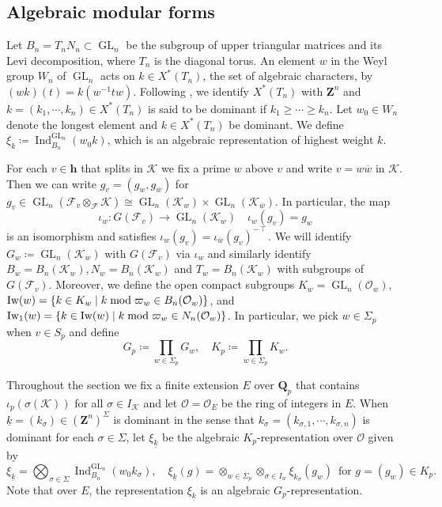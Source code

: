 \documentclass[leqno]{amsart}
\theoremstyle{definition}
\theoremstyle{remark}
\newcommand{\oo}{\mathcal{O}}
\newcommand{\Z}{{\mathbf{Z}}}
\newcommand{\Qp}{\mathbf{Q}_p}
\newcommand{\finite}{\mathbf{h}}
\DeclareMathOperator{\Ind}{Ind}
\DeclareMathOperator{\GL}{GL}
\newcommand{\F}{{\mathcal{F}}} %
\newcommand{\K}{{\mathcal{K}}} %
\newcommand{\bw}{\overline{w}}
\newcommand{\wt}[1]{\underline{ #1 }}
\newcommand{\Iw}{\textnormal{Iw}} %
\begin{document}
\subsection{Algebraic modular forms}

Let $B_n=T_nN_n\subset \GL_n$ be the subgroup of
upper triangular matrices and its Levi decomposition,
where $T_n$ is the diagonal torus.
An element $w$ in the Weyl group $W_n$ of $\GL_n$
acts on $k\in X^*(T_n)$, the set of algebraic characters,
by $(wk)(t)=k(w^{-1}tw)$.
Following \cite[Def 2.3]{ger},
we identify $X^*(T_n)$ with $\Z^n$
and $k=(k_1,\cdots,k_n)\in X^*(T_n)$
is said to be dominant if $k_1\geq \cdots\geq k_n$.
Let $w_0\in W_n$ denote the longest element
and $k\in X^*(T_n)$ be dominant.
We define $\xi_k\coloneqq \Ind_{B_n}^{\GL_n}(w_0k)$,
which is an algebraic representation 
of highest weight $k$.

For each $v\in\finite$ that splits in $\K$
we fix a prime $w$ above $v$
and write $v=w\bw$ in $\K$.
Then we can write $g_v=(g_w,g_{\bw})$
for $g_v\in \GL_n(\F_v\otimes_\F\K)
\cong \GL_n(\K_w)\times\GL_n(\K_{\bw})$.
In particular, the map
\begin{equation}
\iota_w\colon G(\F_v)\to \GL_n(\K_w)\quad
\iota_w(g_v)=g_w
\end{equation}
is an isomorphism and satisfies
$\iota_w(g_v)=\iota_{\bw}(g_v)^{-\intercal}$.
We will identify $G_w\coloneqq\GL_n(\K_w)$
with $G(\F_v)$ via $\iota_w$
and similarly identify 
$B_w=B_n(\K_w), N_w=B_n(\K_w)$ and
$T_w=B_n(\K_w)$
with subgroups of $G(\F_v)$.
Moreover, we define the open 
compact subgroups
$K_w=\GL_n(\oo_w)$,
$\Iw(w)=\{k\in K_w\mid k\bmod \varpi_w\in B_n(\oo_w)\}$, and
$\Iw_1(w)=\{k\in \Iw(w)\mid k\bmod \varpi_w\in N_n(\oo_w)\}$.
In particular, we pick $w\in \Sigma_p$ when $v\in S_p$ and define
\[
	G_p\coloneqq\prod_{w\in \Sigma_p}G_w,\quad
	K_p\coloneqq\prod_{w\in \Sigma_p}K_w.
\]

Throughout the section
we fix a finite extension $E$ over $\Qp$
that contains $\iota_p(\sigma(\K))$
for all $\sigma\in I_\K$ and
let $\oo=\oo_E$ be the ring of integers in $E$.
When $\wt{k}=(k_\sigma)\in (\Z^n)^{\Sigma}$
is dominant in the sense that
$k_\sigma=(k_{\sigma,1},\cdots,k_{\sigma,n})$
is dominant for each $\sigma\in \Sigma$,
let $\xi_{\wt{k}}$ be
the algebraic $K_p$-representation over $\oo$ given by
\begin{equation}\label{def:algrep}
	\xi_{\wt{k}}=\bigotimes_{\sigma\in \Sigma}
	\Ind_{B_n}^{\GL_n}(w_0k_{\sigma}),\quad
	\xi_{\wt{k}}(g)=
	\otimes_{w\in \Sigma_p}
	\otimes_{\sigma\in I_w}\xi_{k_\sigma}(g_w)\,
	\text{ for } g=(g_w)\in K_p.
\end{equation}
Note that over $E$, the representation $\xi_{\wt{k}}$ 
is an algebraic $G_p$-representation.
\end{document}
